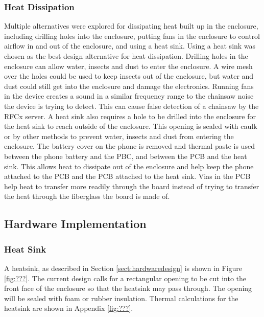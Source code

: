 \documentclass{article}
\numberwithin{figure}{section}
\numberwithin{equation}{section}
\begin{document}
{\subsubsection{Heat Dissipation}
Multiple alternatives were explored for dissipating heat built up in the enclosure, including drilling holes into the enclosure, putting fans in the enclosure to control airflow in and out of the enclosure, and using a heat sink. Using a heat sink was chosen as the best design alternative for heat dissipation. Drilling holes in the enclosure can allow water, insects and dust to enter the enclosure. A wire mesh over the holes could be used to keep insects out of the enclosure, but water and dust could still get into the enclosure and damage the electronics. Running fans in the device creates a sound in a similar frequency range to the chainsaw noise the device is trying to detect. This can cause false detection of a chainsaw by the RFCx server. A heat sink also requires a hole to be drilled into the enclosure for the heat sink to reach outside of the enclosure. This opening is sealed with caulk or by other methods to prevent water, insects and dust from entering the enclosure. The battery cover on the phone is removed and thermal paste is used between the phone battery and the PBC, and between the PCB and the heat sink. This allows heat to dissipate out of the enclosure and help keep the phone attached to the PCB and the PCB attached to the heat sink. Vias in the PCB help heat to transfer more readily through the board instead of trying to transfer the heat through the fiberglass the board is made of.

\subsection{Hardware Implementation} \label{sect:hardwareimp}
\subsubsection{Heat Sink}

A heatsink, as described in Section \ref{sect:hardwaredesign} is shown in Figure \ref{fig:???}.  The current design calls for a rectangular opening to be cut into the front face of the enclosure so that the heatsink may pass through. The opening will be sealed with foam or rubber insulation. Thermal calculations for the heatsink are shown in Appendix \ref{fig:???}.


}
\end{document}
